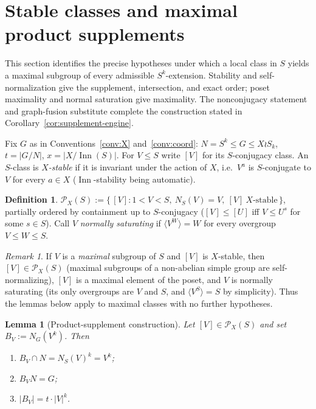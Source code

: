 \documentclass[11pt]{amsart}
\newtheorem{lemma}[theorem]{Lemma}
\theoremstyle{definition}
\newtheorem{definition}[theorem]{Definition}
\theoremstyle{remark}
\newtheorem{remark}[theorem]{Remark}
\DeclareMathOperator{\Inn}{Inn}
\newcommand{\Pos}{\mathcal{P}}
\begin{document}
\section{Stable classes and maximal product supplements}\label{sec:machinery}

This section identifies the precise hypotheses under which a local class in
$S$ yields a maximal subgroup of every admissible $S^k$-extension. Stability
and self-normalization give the supplement, intersection, and exact order;
poset maximality and normal saturation give maximality. The nonconjugacy
statement and graph-fusion substitute complete the construction stated in
Corollary~\ref{cor:supplement-engine}.

Fix $G$ as in Conventions~\ref{conv:X} and~\ref{conv:coord}:
$N=S^k\leq G\leq X\wr S_k$,
$t=|G/N|$, $x=|X/\Inn(S)|$. For $V\leq S$ write $[V]$ for its
$S$-conjugacy class. An $S$-class is \emph{$X$-stable} if it is invariant
under the action of $X$,
i.e.\ $V^a$ is $S$-conjugate to $V$ for every $a\in X$ ($\Inn$-stability
being automatic).

\begin{definition}\label{def:poset}
$\Pos_X(S):=\{\,[V] : 1<V<S,\ N_S(V)=V,\ [V]\ X\text{-stable}\,\}$,
partially ordered by containment up to $S$-conjugacy
($[V]\leq[U]$ iff $V\leq U^s$ for some $s\in S$). Call $V$
\emph{normally saturating} if $\langle V^W\rangle=W$ for every overgroup
$V\leq W\leq S$.
\end{definition}

\begin{remark}\label{rem:maxauto}
If $V$ is a \emph{maximal} subgroup of $S$ and $[V]$ is $X$-stable, then
$[V]\in\Pos_X(S)$ (maximal subgroups of a non-abelian simple group are
self-normalizing), $[V]$ is a maximal element of the poset, and $V$ is
normally saturating (its only overgroups are $V$ and $S$, and
$\langle V^S\rangle=S$ by simplicity). Thus the lemmas below apply to
maximal classes with no further hypotheses.
\end{remark}

\begin{lemma}[Product-supplement construction]\label{lem:A}
Let $[V]\in\Pos_X(S)$ and set $B_V:=N_G(V^k)$. Then
\begin{enumerate}
\item $B_V\cap N=N_S(V)^k=V^k$;
\item $B_VN=G$;
\item $|B_V|=t\cdot|V|^k$.
\end{enumerate}
\end{lemma}
\end{document}
